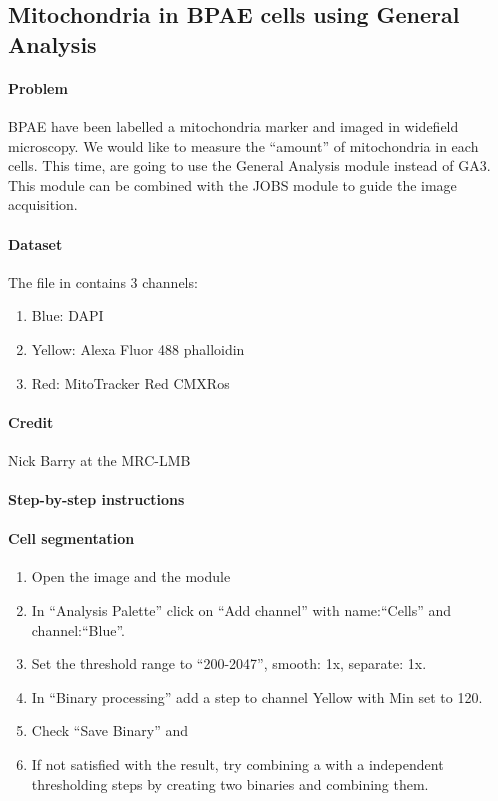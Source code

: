 \subsection{Mitochondria in BPAE cells using General Analysis} \label{sec:bpae-mitochondria}

\paragraph{Problem}
BPAE have been labelled a mitochondria marker and imaged in widefield microscopy. We would like to measure the ``amount'' of mitochondria in each cells. This time, are going to use the General Analysis module instead of GA3. This module can be combined with the JOBS module to guide the image acquisition.

\paragraph{Dataset} The file in  contains 3 channels:
\begin{enumerate}\itemsep0em
    \item Blue: DAPI
    \item Yellow: Alexa Fluor 488 phalloidin
    \item Red: MitoTracker Red CMXRos
\end{enumerate}

\paragraph{Credit} Nick Barry at the MRC-LMB

\paragraph{Step-by-step instructions}
\paragraph{Cell segmentation}
\begin{enumerate}
    \item Open the image  and the module 
    \item In ``Analysis Palette'' click on ``Add channel'' with name:``Cells'' and channel:``Blue''.
    \item Set the threshold range to ``200-2047'', smooth: 1x, separate: 1x.
    \item In ``Binary processing'' add a step  to channel Yellow with Min set to 120.
    \item Check ``Save Binary'' and 
    \item If not satisfied with the result, try combining a  with a independent thresholding steps by creating two binaries and combining them.
\end{enumerate}


